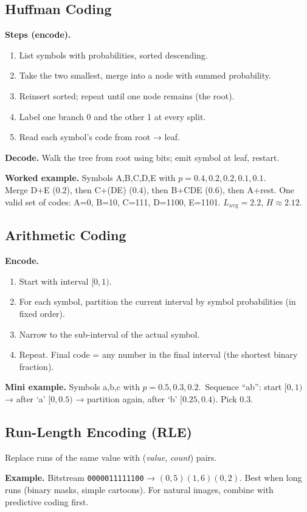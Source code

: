 \documentclass[10pt]{article}
\begin{document}
\subsection{Huffman Coding}
\begin{tcolorbox}[procbox]
\textbf{Steps (encode).}
\begin{enumerate}
  \item List symbols with probabilities, sorted descending.
  \item Take the two smallest, merge into a node with summed probability.
  \item Reinsert sorted; repeat until one node remains (the root).
  \item Label one branch 0 and the other 1 at every split.
  \item Read each symbol's code from root → leaf.
\end{enumerate}
\textbf{Decode.} Walk the tree from root using bits; emit symbol at leaf, restart.
\end{tcolorbox}
\textbf{Worked example.} Symbols A,B,C,D,E with $p=0.4,0.2,0.2,0.1,0.1$.\\
Merge D+E ($0.2$), then C+(DE) ($0.4$), then B+CDE ($0.6$), then A+rest. One valid set of codes: A=0, B=10, C=111, D=1100, E=1101. $L_{\text{avg}}=2.2$, $H \approx 2.12$.

\subsection{Arithmetic Coding}
\begin{tcolorbox}[procbox]
\textbf{Encode.}
\begin{enumerate}
  \item Start with interval $[0,1)$.
  \item For each symbol, partition the current interval by symbol probabilities (in fixed order).
  \item Narrow to the sub-interval of the actual symbol.
  \item Repeat. Final code = any number in the final interval (the shortest binary fraction).
\end{enumerate}
\end{tcolorbox}
\textbf{Mini example.} Symbols a,b,c with $p=0.5,0.3,0.2$.\
Sequence ``ab'': start $[0,1)$ → after `a' $[0,0.5)$ → partition again, after `b' $[0.25,0.4)$. Pick 0.3.

\subsection{Run-Length Encoding (RLE)}
\begin{tcolorbox}[procbox]
Replace runs of the same value with (\emph{value}, \emph{count}) pairs.
\end{tcolorbox}
\textbf{Example.} Bitstream \texttt{0000011111100} → $(0,5)(1,6)(0,2)$.
Best when long runs (binary masks, simple cartoons). For natural images, combine with predictive coding first.
\end{document}
